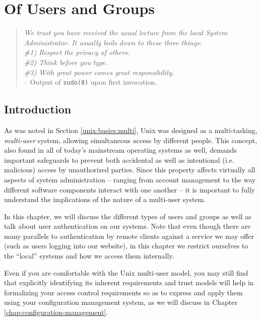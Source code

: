 \chapter{Of Users and Groups}
\label{chap:multi-user}

\begin{quote}

{\em We trust you have received the usual lecture from
the local System Administrator. It usually boils down
to these three things:\\
\#1) Respect the privacy of others.\\
\#2) Think before you type.\\
\#3) With great power comes great responsibility.} \\
-- Output of {\tt sudo(8)} upon first invocation.
\end{quote}


\section{Introduction}
\label{multi-user:introduction}

As was noted in Section \ref{unix:basics:multi}, Unix
was designed as a multi-tasking, {\em multi-user}
system, allowing simultaneous access by different
people.  This concept, also found in all of today's
mainstream operating systems as well, demands
important safeguards to prevent both accidental as
well as intentional (i.e. malicious) access by
unauthorized parties.  Since this property affects
virtually all aspects of system administration --
ranging from account management to the way different
software components interact with one another -- it is
important to fully understand the implications of the
nature of a multi-user system.

In this chapter, we will discuss the different types
of users and groups as well as talk about user
authentication on our systems.  Note that even though
there are many parallels to authentication by remote
clients against a service we may offer (such as users
logging into our website), in this chapter we restrict
ourselves to the ``local'' systems and how we access
them internally.

Even if you are comfortable with the Unix multi-user
model, you may still find that explicitly identifying
its inherent requirements and trust models will help
in formalizing your access control requirements so
as to express and apply them using your configuration
management system, as
we will discuss in Chapter
\ref{chap:configuration-management}.

